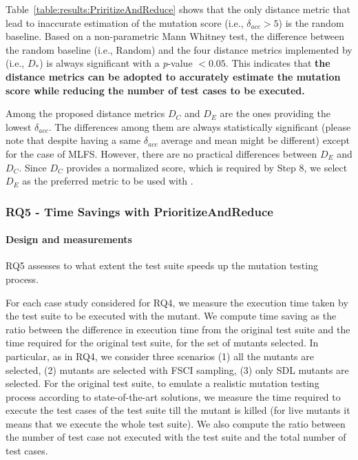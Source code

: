 Table~\ref{table:results:PriritizeAndReduce} shows that the only distance metric that lead to inaccurate estimation of the mutation score (i.e., $\delta_{acc}  > 5$) is the random baseline.
Based on a non-parametric Mann Whitney test, the difference between the random baseline (i.e., Random) and the four distance metrics implemented by \APPR (i.e., $D_*$) is always significant with a \textit{p}-value $< 0.05$. This indicates that \textbf{the \APPR distance metrics can be adopted to accurately estimate the mutation score while reducing the number of test cases to be executed.}

Among the proposed distance metrics $D_C$ and $D_E$ are the ones providing the lowest $\delta_{acc}$. The differences among them are always statistically significant (please note that despite having a same $\delta_{acc}$ average and mean might be different) except for the case of MLFS. 
However, there are no practical differences between $D_E$ and $D_C$. 
Since $D_C$ provides a normalized score, which is required by Step 8, we select $D_E$ as the preferred metric to be used with \APPR.



\subsubsection{RQ5 - Time Savings with PrioritizeAndReduce}

\paragraph{Design and measurements}

RQ5 assesses to what extent  the \APPR test suite speeds up the mutation testing process.


For each case study considered for RQ4, we measure the execution time taken by the \APPR test suite to be executed with the mutant.
We compute time saving as the ratio between the difference in execution time from the original test suite and the time required for the original test suite, for the set of mutants selected.
In particular, as in RQ4, we consider three scenarios (1) all the mutants are selected, (2) mutants are selected with FSCI sampling, (3) only SDL mutants are selected.
For the original test suite, to emulate a realistic mutation testing process according to state-of-the-art solutions, we measure the time required to execute the test cases of the test suite till the mutant is killed (for live mutants it means that we execute the whole test suite). 
We also compute 
the ratio between the number of test case not executed with the \APPR test suite and the total number of test cases.


